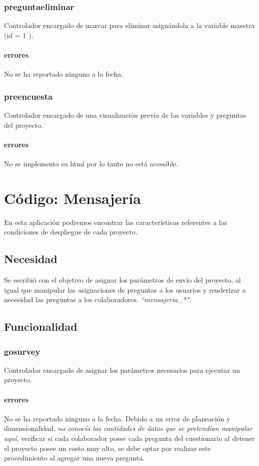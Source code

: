 \documentclass[10pt,a4paper]{book}
\begin{document}
	\subsection{preguntaeliminar}
	Controlador encargado de marcar para eliminar asignándola a la variable maestra (id = 1 ).
	\subsubsection{errores}
	No se ha reportado ninguno a la fecha.

	\subsection{preencuesta}
	Controlador encargado de una visualización previa de las variables y preguntas del proyecto.
	\subsubsection{errores}
	No se implemento su html por lo tanto no está accesible.


	\chapter{Código: Mensajería}

	En esta aplicación podremos encontrar las características referentes a las condiciones de despliegue de cada proyecto.

	\section{Necesidad}
		
	Se escribió con el objetivo de asignar los parámetros de envío del proyecto, al igual que manipular las asignaciones de preguntas a los usuarios y renderizar a necesidad las preguntas a los colaboradores. \textit{``mensajeria\_*"}. 
	
	\section{Funcionalidad}

	\subsection{gosurvey}
	Controlador encargado de asignar los parámetros necesarios para ejecutar un proyecto.
	
	\subsubsection{errores}
	No se ha reportado ninguno a la fecha. Debido a un error de planeación y dimensionalidad, \textit{no conocía las cantidades de datos que se pretendían manipular aquí}, verificar si cada colaborador posee cada pregunta del cuestionario al detener el proyecto posee un costo muy alto, se debe optar por realizar este procedimiento al agregar una nueva pregunta.
	
\end{document}
